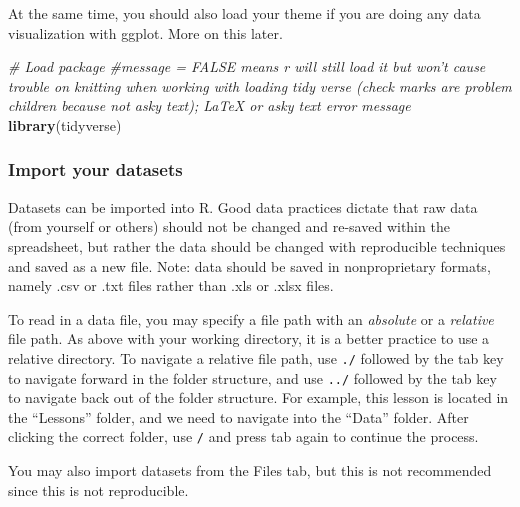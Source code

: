 \documentclass[]{article}
\newenvironment{Shaded}{\begin{snugshade}}{\end{snugshade}}
\newcommand{\CommentTok}[1]{\textcolor[rgb]{0.56,0.35,0.01}{\textit{#1}}}
\newcommand{\KeywordTok}[1]{\textcolor[rgb]{0.13,0.29,0.53}{\textbf{#1}}}
\newcommand{\NormalTok}[1]{#1}
\begin{document}
At the same time, you should also load your theme if you are doing any
data visualization with ggplot. More on this later.

\begin{Shaded}
\begin{Highlighting}[]
\CommentTok{# Load package}
\CommentTok{#message = FALSE means r will still load it but won't cause trouble on knitting when working with loading tidy verse (check marks are problem children because not asky text); LaTeX or asky text error message}
\KeywordTok{library}\NormalTok{(tidyverse)}
\end{Highlighting}
\end{Shaded}

\hypertarget{import-your-datasets}{%
\subsubsection{Import your datasets}\label{import-your-datasets}}

Datasets can be imported into R. Good data practices dictate that raw
data (from yourself or others) should not be changed and re-saved within
the spreadsheet, but rather the data should be changed with reproducible
techniques and saved as a new file. Note: data should be saved in
nonproprietary formats, namely .csv or .txt files rather than .xls or
.xlsx files.

To read in a data file, you may specify a file path with an
\emph{absolute} or a \emph{relative} file path. As above with your
working directory, it is a better practice to use a relative directory.
To navigate a relative file path, use \texttt{./} followed by the tab
key to navigate forward in the folder structure, and use \texttt{../}
followed by the tab key to navigate back out of the folder structure.
For example, this lesson is located in the ``Lessons'' folder, and we
need to navigate into the ``Data'' folder. After clicking the correct
folder, use \texttt{/} and press tab again to continue the process.

You may also import datasets from the Files tab, but this is not
recommended since this is not reproducible.
\end{document}
